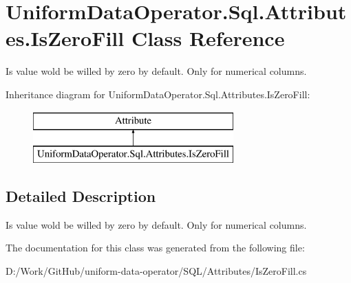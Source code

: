 \hypertarget{class_uniform_data_operator_1_1_sql_1_1_attributes_1_1_is_zero_fill}{}\section{Uniform\+Data\+Operator.\+Sql.\+Attributes.\+Is\+Zero\+Fill Class Reference}
\label{class_uniform_data_operator_1_1_sql_1_1_attributes_1_1_is_zero_fill}


Is value wold be willed by zero by default. Only for numerical columns.  


Inheritance diagram for Uniform\+Data\+Operator.\+Sql.\+Attributes.\+Is\+Zero\+Fill\+:\begin{figure}[H]
\begin{center}
\leavevmode
\includegraphics[height=2.000000cm]{d5/d8d/class_uniform_data_operator_1_1_sql_1_1_attributes_1_1_is_zero_fill}
\end{center}
\end{figure}


\subsection{Detailed Description}
Is value wold be willed by zero by default. Only for numerical columns. 



The documentation for this class was generated from the following file\+:\begin{DoxyCompactItemize}
\item 
D\+:/\+Work/\+Git\+Hub/uniform-\/data-\/operator/\+S\+Q\+L/\+Attributes/Is\+Zero\+Fill.\+cs\end{DoxyCompactItemize}
